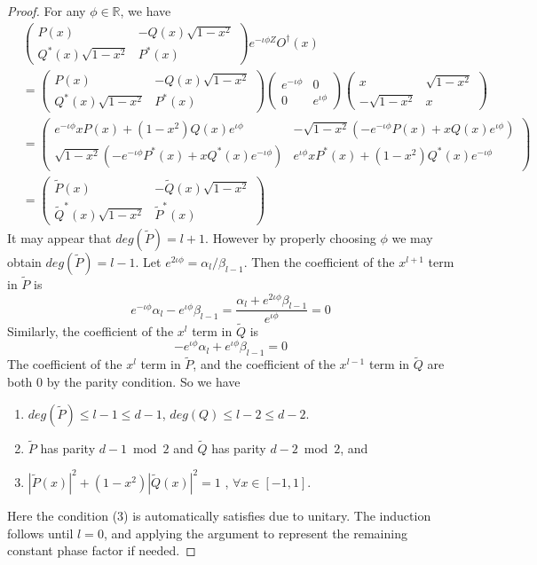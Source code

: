 \documentclass[12pt, oneside]{book}
\theoremstyle{definition}
\theoremstyle{definition}
\theoremstyle{remark}
\begin{document}
\begin{proof}
    For any $\phi \in \mathbb{R}$, we have
    \begin{align*}
    &\begin{pmatrix} P(x) & -Q(x)\sqrt{1-x^2} \\ Q^*(x)\sqrt{1-x^2} & P^*(x) \end{pmatrix} e^{-\iota \phi Z}O^{\dagger}(x)\\
    &=\begin{pmatrix} P(x) & -Q(x)\sqrt{1-x^2} \\ Q^*(x)\sqrt{1-x^2} & P^*(x) \end{pmatrix} 
    \begin{pmatrix} e^{-\iota \phi} & 0 \\ 0 & e^{\iota \phi} \end{pmatrix} 
    \begin{pmatrix} x & \sqrt{1-x^2} \\ -\sqrt{1-x^2} & x \end{pmatrix}\\
    &=\begin{pmatrix} e^{-\iota \phi}xP(x)+(1-x^2)Q(x)e^{\iota \phi} & -\sqrt{1-x^2} (-e^{-\iota \phi}P(x) + xQ(x)e^{\iota \phi}) \\ \sqrt{1-x^2}(-e^{-\iota \phi}P^*(x) + xQ^*(x)e^{-\iota \phi}) & e^{\iota \phi}xP^*(x) + (1-x^2)Q^*(x)e^{-\iota \phi} \end{pmatrix} \\ 
    &=\begin{pmatrix} \tilde{P}(x) & -\tilde{Q}(x)\sqrt{1-x^2} \\ \tilde{Q}^*(x)\sqrt{1-x^2} & \tilde{P}^*(x) \end{pmatrix}
\end{align*}
It may appear that $deg(\tilde{P})=l+1$. However by properly choosing $\phi$ we may obtain $deg(\tilde{P}) = l-1$. Let $e^{2\iota \phi} = \alpha_l/\beta_{l-1}$. Then the coefficient of the $x^{l+1}$ term in $\tilde{P}$ is
\[
e^{-\iota \phi}\alpha_l - e^{\iota \phi}\beta_{l-1}=\frac{\alpha_l + e^{2\iota\phi}\beta_{l-1}}{e^{\iota\phi}} =0
\]
Similarly, the coefficient of the $x^l$ term in $\tilde{Q}$ is
\[
-e^{\iota \phi}\alpha_l + e^{\iota \phi}\beta_{l-1}=0
\]
The coefficient of the $x^l$ term in $\tilde{P}$, and the coefficient of the $x^{l-1}$ term in $\tilde{Q}$ are both $0$ by the parity condition. So we have
\begin{enumerate}
    \item $deg(\tilde{P}) \leq l-1 \leq d-1$, $deg(Q)\leq l-2 \leq d-2$.
    \item $\tilde{P}$ has parity $d-1\bmod 2$ and $\tilde{Q}$ has parity $d-2\bmod 2$, and
    \item $|\tilde{P}(x)|^2 + (1-x^2)|\tilde{Q}(x)|^2 = 1$ , $\forall x \in [-1,1]$.
\end{enumerate}
Here the condition (3) is automatically satisfies due to unitary. The induction follows until $l=0$, and applying the argument to represent the remaining constant phase factor if needed.
\end{proof}
\end{document}

